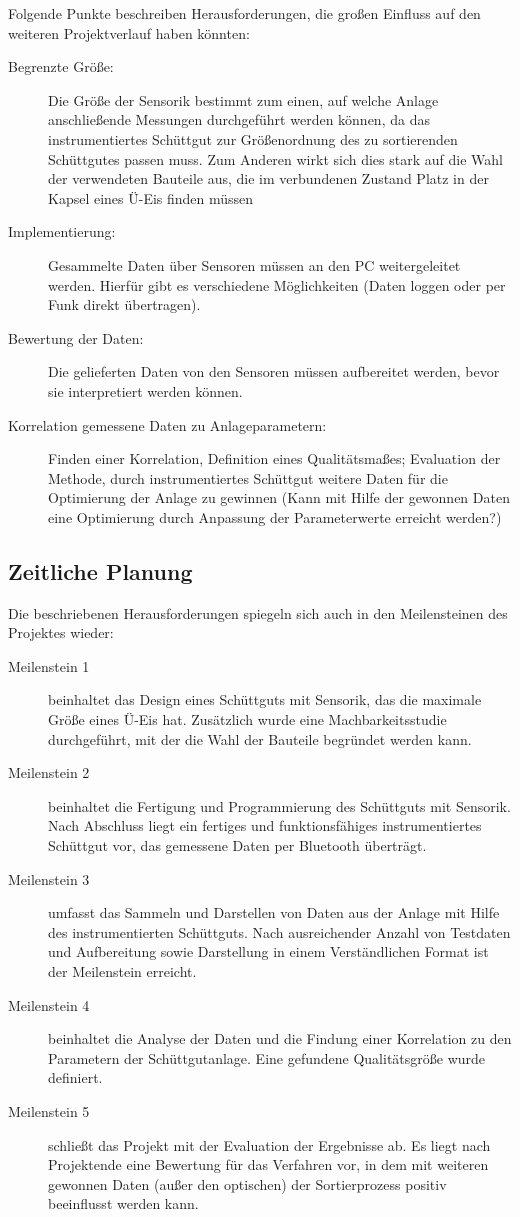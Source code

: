 Folgende Punkte beschreiben Herausforderungen, die großen Einfluss auf den weiteren Projektverlauf haben könnten:
\begin{description}
	\item [Begrenzte Größe:] Die Größe der Sensorik bestimmt zum einen, auf welche Anlage anschließende Messungen durchgeführt werden können, da das instrumentiertes Schüttgut zur Größenordnung des zu sortierenden Schüttgutes passen muss. Zum Anderen wirkt sich dies stark auf die Wahl der verwendeten Bauteile aus, die im verbundenen Zustand Platz in der Kapsel eines Ü-Eis finden müssen
	\item [Implementierung:] Gesammelte Daten über Sensoren müssen an den PC weitergeleitet werden. Hierfür gibt es verschiedene Möglichkeiten (Daten loggen oder per Funk direkt übertragen).
	\item [Bewertung der Daten:] Die gelieferten Daten von den Sensoren müssen aufbereitet werden, bevor sie interpretiert werden können.
	\item [Korrelation gemessene Daten zu Anlageparametern:] Finden einer Korrelation, Definition eines Qualitätsmaßes; Evaluation der Methode, durch instrumentiertes Schüttgut weitere Daten für die Optimierung der Anlage zu gewinnen (Kann mit Hilfe der gewonnen Daten eine Optimierung durch Anpassung der Parameterwerte erreicht werden?)
\end{description}  %

\subsection{Zeitliche Planung}

Die beschriebenen Herausforderungen spiegeln sich auch in den Meilensteinen des Projektes wieder:
\begin{description}
	\item [Meilenstein 1] beinhaltet das Design eines Schüttguts mit Sensorik, das die maximale Größe eines Ü-Eis hat. Zusätzlich wurde eine Machbarkeitsstudie durchgeführt, mit der die Wahl der Bauteile begründet werden kann.
	\item [Meilenstein 2] beinhaltet die Fertigung und Programmierung des Schüttguts mit Sensorik. Nach Abschluss liegt ein fertiges und funktionsfähiges instrumentiertes Schüttgut vor, das gemessene Daten per Bluetooth überträgt.
	\item [Meilenstein 3] umfasst das Sammeln und Darstellen von Daten aus der Anlage mit Hilfe des instrumentierten Schüttguts. Nach ausreichender Anzahl von Testdaten und Aufbereitung sowie Darstellung in einem Verständlichen Format ist der Meilenstein erreicht.
	\item [Meilenstein 4] beinhaltet die Analyse der Daten und die Findung einer Korrelation zu den Parametern der Schüttgutanlage. Eine gefundene Qualitätsgröße wurde definiert.
	\item [Meilenstein 5] schließt das Projekt mit der Evaluation der Ergebnisse ab. Es liegt nach Projektende eine Bewertung für das Verfahren vor, in dem mit  weiteren gewonnen Daten (außer den optischen) der Sortierprozess positiv beeinflusst werden kann.
\end{description}
	
